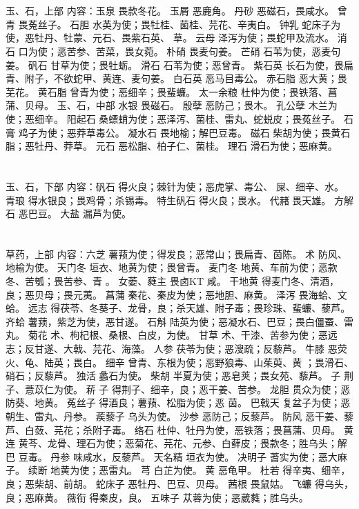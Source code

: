 \documentclass[12pt,UTF8]{ctexbook}
\begin{document}
\chapter{}玉、石，上部
内容：玉泉 畏款冬花。 
玉屑 恶鹿角。 
丹砂 恶磁石，畏咸水。 
曾青 畏菟丝子。 
石胆 水英为使；畏牡桂、菌桂、芫花、辛夷白。 
钟乳 蛇床子为使，恶牡丹、牡蒙、元石、畏紫石英、 草。 
云母 泽泻为使；畏蛇甲及流水。 
消石 口为使；恶苦参、苦菜，畏女菀。 
朴硝 畏麦句姜。 
芒硝 石苇为使，恶麦句姜。 
矾石 甘草为使；畏牡蛎。 
滑石 石苇为使；恶曾青。 
紫石英 长石为使，畏扁青、附子，不欲蛇甲、黄连、麦句姜。 
白石英 恶马目毒公。 
赤石脂 恶大黄；畏芜花。 
黄石脂 曾青为使；恶细辛；畏蜚蠊。 
太一余粮 杜仲为使；畏铁落、菖蒲、贝母。 
玉、石，中部 
水银 畏磁石。 
殷孽 恶防己；畏木。 
孔公孽 木兰为使；恶细辛。 
阳起石 桑螵蛸为使；恶泽泻、菌桂、雷丸、蛇蜕皮；畏菟丝子。 
石膏 鸡子为使；恶莽草毒公。 
凝水石 畏地榆；解巴豆毒。 
磁石 柴胡为使；畏黄石脂；恶牡丹、莽草。 
元石 恶松脂、柏子仁、菌桂。 
理石 滑石为使；恶麻黄。 


\chapter{}玉、石，下部
内容：矾石 得火良；棘针为使；恶虎掌、毒公、 屎、细辛、水。 
青琅 得水银良；畏鸡骨；杀锡毒。 
特生矾石 得火良；畏水。 
代赭 畏天雄。 
方解石 恶巴豆。 
大盐 漏芦为使。 


\chapter{}草药，上部
内容：六芝 薯蓣为使；得发良；恶常山；畏扁青、茵陈。 
术 防风、地榆为使。 
天门冬 垣衣、地黄为使；畏曾青。 
麦门冬 地黄、车前为使；恶款冬、苦瓠；畏苦参、青 。 
女萎、蕤主 畏卤KT 咸。 
干地黄 得麦门冬、清酒，良；恶贝母；畏元荑。 
菖蒲 秦花、秦皮为使；恶地胆、麻黄。 
泽泻 畏海蛤、文蛤。 
远志 得茯苓、冬葵子、龙骨，良；杀天雄、附子毒；畏珍珠、蜚蠊、藜芦。 
齐蛤 薯蓣，紫芝为使，恶甘遂。 
石斛 陆英为使；恶凝水石、巴豆；畏白僵蚕、雷丸。 
菊花 术、枸杞根、桑根、白皮，为使。 
甘草 术、干漆、苦参为使；恶远志；反甘遂、大戟、芫花、海藻。 
人参 茯苓为使；恶溲疏；反藜芦。 
牛膝 恶荧火、龟、陆英；畏白。 
细辛 曾青、东根为使；恶野狼毒、山茱萸、黄 ；畏滑石、硝石；反藜芦。 
独活 蠡石为使。 
柴胡 半夏为使；恶皂荚；畏女苑、藜芦。 
子 荆子、薏苡仁为使。 
菥 子 得荆子、细辛，良；恶干姜、苦参。 
龙胆 贯众为使；恶防葵、地黄。 
菟丝子 得酒良；薯蓣、松脂为使；恶 茵。 
巴戟天 复盆子为使；恶朝生、雷丸、丹参。 
蒺藜子 乌头为使。 
沙参 恶防己；反藜芦。 
防风 恶干姜、藜芦、白蔹、芫花；杀附子毒。 
络石 杜仲、牡丹为使，恶铁落；畏菖蒲、贝母。 
黄连 黄芩、龙骨、理石为使；恶菊花、芫花、元参、白藓皮；畏款冬；胜乌头；解巴 
豆毒。 
丹参 味咸水，反藜芦。 
天名精 垣衣为使。 
决明子 蓍实为使；恶大麻子。 
续断 地黄为使；恶雷丸。 
芎 白芷为使。 
黄 恶龟甲。 
杜若 得辛夷、细辛，良；恶柴胡、前胡。 
蛇床子 恶牡丹、巴豆、贝母。 
茜根 畏鼠姑。 
飞蠊 得乌头，良；恶麻黄。 
薇衔 得秦皮，良。 
五味子 苁蓉为使；恶葳蕤；胜乌头。 
\end{document}
